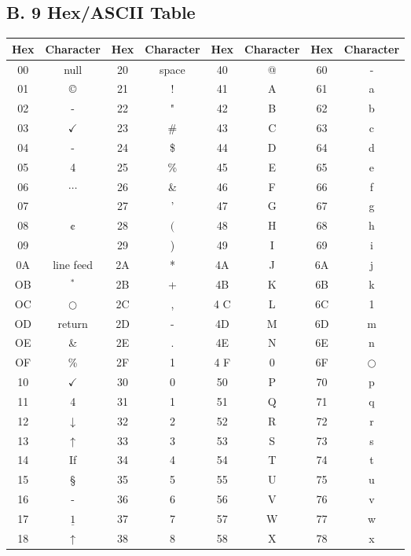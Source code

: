 \documentclass[10pt]{book}
\begin{document}
\begin{center}
\begin{center}
\begin{center}
\begin{center}
\begin{center}
\section*{B. 9 Hex/ASCII Table}
\begin{center}
\begin{tabular}{|c|c|c|c|c|c|c|c|}
\hline
Hex & Character & Hex & Character & Hex & Character & Hex & Character \\
\hline
00 & null & 20 & space & 40 & @ & 60 & - \\
\hline
01 & © & 21 & ! & 41 & A & 61 & a \\
\hline
02 & - & 22 & " & 42 & B & 62 & b \\
\hline
03 & $\checkmark$ & 23 & \# & 43 & C & 63 & c \\
\hline
04 & - & 24 & \$ & 44 & D & 64 & d \\
\hline
05 & 4 & 25 & \% & 45 & E & 65 & e \\
\hline
06 & $\cdots$ & 26 & \& & 46 & F & 66 & f \\
\hline
07 &  & 27 & ' & 47 & G & 67 & g \\
\hline
08 & ¢ & 28 & $($ & 48 & H & 68 & h \\
\hline
09 &  & 29 & ) & 49 & I & 69 & i \\
\hline
0A & line feed & 2A & * & 4A & J & 6A & j \\
\hline
OB & ${ }^{*}$ & 2B & + & 4B & K & 6B & k \\
\hline
OC & $\bigcirc$ & 2C & , & 4 C & L & 6C & 1 \\
\hline
OD & return & 2D & - & 4D & M & 6D & m \\
\hline
OE & \& & 2E & . & 4E & N & 6E & n \\
\hline
OF & \% & 2F & 1 & 4 F & 0 & 6F & $\bigcirc$ \\
\hline
10 & $\checkmark$ & 30 & 0 & 50 & P & 70 & p \\
\hline
11 & 4 & 31 & 1 & 51 & Q & 71 & q \\
\hline
12 & $\downarrow$ & 32 & 2 & 52 & R & 72 & r \\
\hline
13 & $\uparrow$ & 33 & 3 & 53 & S & 73 & s \\
\hline
14 & If & 34 & 4 & 54 & T & 74 & t \\
\hline
15 & § & 35 & 5 & 55 & U & 75 & u \\
\hline
16 & - & 36 & 6 & 56 & V & 76 & v \\
\hline
17 & $\underline{1}$ & 37 & 7 & 57 & W & 77 & w \\
\hline
18 & $\uparrow$ & 38 & 8 & 58 & X & 78 & x \\

\end{tabular}
\end{center}
\end{center}
\end{center}
\end{center}
\end{center}
\end{center}
\end{document}
